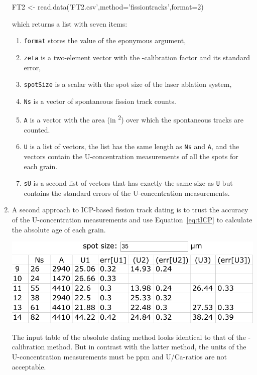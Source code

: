 \begin{refsection}
\begin{enumerate}
\begin{console}
FT2 <- read.data('FT2.csv',method='fissiontracks',format=2)
\end{console}

\noindent which returns a list with seven items:

\begin{enumerate}
\item\texttt{format} stores the value of the eponymous argument,
\item\texttt{zeta} is a two-element vector with the
  \textzeta-calibration factor and its standard error,
\item\texttt{spotSize} is a scalar with the spot size of the laser
  ablation system,
\item\texttt{Ns} is a vector of spontaneous fission track counts.
\item\texttt{A} is a vector with the area (in
  \textsuperscript{2}) over which the spontaneous tracks are
  counted.
\item\texttt{U} is a list of vectors, the list has the same length as
  \texttt{Ns} and \texttt{A}, and the vectors contain the
  U-concentration measurements of all the spots for each grain.
\item\label{it:ICPsU}\texttt{sU} is a second list of vectors that has
  exactly the same size as \texttt{U} but contains the standard errors
  of the U-concentration measurements.
\end{enumerate}

\item A second approach to ICP-based fission track dating is to trust
  the accuracy of the U-concentration measurements and use
  Equation~\ref{eq:tICP} to calculate the absolute age of each grain.

\noindent\begin{minipage}[t]{.60\linewidth}
\strut\vspace*{-\baselineskip}\newline
\includegraphics[width=\linewidth]{../figures/FTICPabsolute.png}
\end{minipage}
\begin{minipage}[t]{.40\linewidth}
  The input table of the absolute dating method looks identical to
  that of the \textzeta-calibration method. But in contrast with the
  latter method, the units of the U-concentration measurements must be
  ppm and U/Ca-ratios are not acceptable.
\end{minipage}


\end{enumerate}
\end{refsection}
